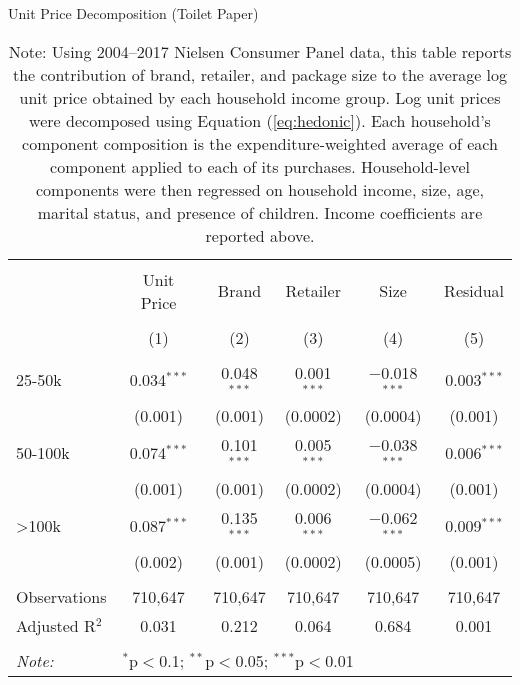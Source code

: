 \begin{table}[!htbp] \centering
  \caption{Unit Price Decomposition (Toilet Paper)}
  \label{tab:tpPriceDecomp}
\begin{tabular}{@{\extracolsep{5pt}}lccccc}
\\[-1.8ex]\hline
\hline \\[-1.8ex]
 & Unit Price & Brand & Retailer & Size & Residual \\
\\[-1.8ex] & (1) & (2) & (3) & (4) & (5)\\
\hline \\[-1.8ex]
 25-50k & 0.034$^{***}$ & 0.048$^{***}$ & 0.001$^{***}$ & $-$0.018$^{***}$ & 0.003$^{***}$ \\
  & (0.001) & (0.001) & (0.0002) & (0.0004) & (0.001) \\
  50-100k & 0.074$^{***}$ & 0.101$^{***}$ & 0.005$^{***}$ & $-$0.038$^{***}$ & 0.006$^{***}$ \\
  & (0.001) & (0.001) & (0.0002) & (0.0004) & (0.001) \\
  >100k & 0.087$^{***}$ & 0.135$^{***}$ & 0.006$^{***}$ & $-$0.062$^{***}$ & 0.009$^{***}$ \\
  & (0.002) & (0.001) & (0.0002) & (0.0005) & (0.001) \\
 \hline \\[-1.8ex]
Observations & 710,647 & 710,647 & 710,647 & 710,647 & 710,647 \\
Adjusted R$^{2}$ & 0.031 & 0.212 & 0.064 & 0.684 & 0.001 \\
\hline
\hline \\[-1.8ex]
\textit{Note:}  & \multicolumn{5}{l}{$^{*}$p$<$0.1; $^{**}$p$<$0.05; $^{***}$p$<$0.01} \\
\end{tabular}
\caption*{Note: Using 2004--2017 Nielsen Consumer Panel data, this table reports the contribution of brand, retailer, and package size to the average log unit price obtained by each household income group. Log unit prices were decomposed using Equation (\ref{eq:hedonic}). Each household's component composition is the expenditure-weighted average of each component applied to each of its purchases. Household-level components were then regressed on household income, size, age, marital status, and presence of children. Income coefficients are reported above.}
\end{table}
